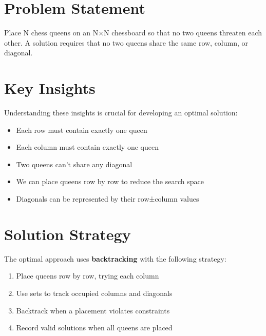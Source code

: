 
\label{problem:n_queens}

\section*{Problem Statement}
Place N chess queens on an N×N chessboard so that no two queens threaten each other. A solution requires that no two queens share the same row, column, or diagonal.


\section*{Key Insights}
Understanding these insights is crucial for developing an optimal solution:
\begin{itemize}
    \item Each row must contain exactly one queen
    \item Each column must contain exactly one queen
    \item Two queens can't share any diagonal
    \item We can place queens row by row to reduce the search space
    \item Diagonals can be represented by their row±column values
\end{itemize}

\section*{Solution Strategy}
The optimal approach uses \textbf{backtracking} with the following strategy:

\begin{enumerate}
    \item Place queens row by row, trying each column
    \item Use sets to track occupied columns and diagonals
    \item Backtrack when a placement violates constraints
    \item Record valid solutions when all queens are placed
\end{enumerate}

